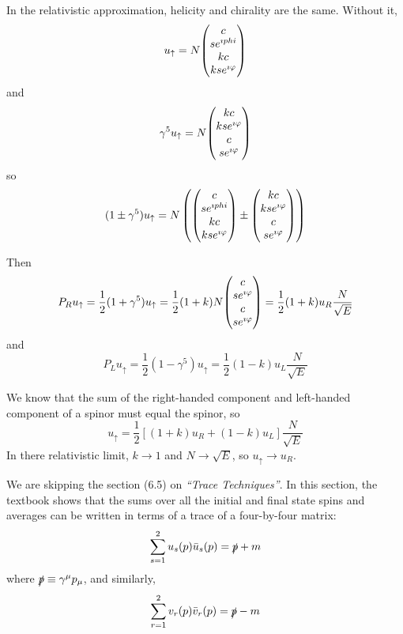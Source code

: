\documentclass[a4paper,twoside,master.tex]{subfiles}
\begin{document}

In the relativistic approximation, helicity and chirality are the same. Without it,
\begin{equation}
    u_{\uparrow} = N \mqty(c\\s e^{\imath ph i} \\kc\\kse^{\imath \varphi})
\end{equation}
and
\begin{equation}
    \gamma^5 u_{\uparrow} = N \mqty(kc\\kse^{\imath \varphi} \\c\\se^{\imath \varphi})
\end{equation}
so
\begin{equation}
    (1\pm \gamma^5)u_{\uparrow} = N\left( \mqty(c\\s e^{\imath ph i} \\kc\\kse^{\imath \varphi}) \pm \mqty(kc\\kse^{\imath \varphi} \\c\\se^{\imath \varphi}) \right)
\end{equation}

Then
\begin{equation}
    P_R u_{\uparrow} = \frac{1}{2} (1 + \gamma^5) u_{\uparrow} = \frac{1}{2} (1 + k)N \mqty(c\\s e^{\imath \varphi} \\c\\s e^{\imath \varphi}) = \frac{1}{2} (1 + k)u_R \frac{N}{\sqrt{E}}
\end{equation}
and
\begin{equation}
    P_L u_{\uparrow} = \frac{1}{2} (1 - \gamma^5)u_{\uparrow} = \frac{1}{2} (1 - k)u_L \frac{N}{\sqrt{E}}
\end{equation}

We know that the sum of the right-handed component and left-handed component of a spinor must equal the spinor, so
\begin{equation}
    u_{\uparrow} = \frac{1}{2} \left[ (1 + k)u_R + (1-k)u_L \right] \frac{N}{\sqrt{E}}
\end{equation}
In there relativistic limit, $ k \to 1 $ and $ N \to \sqrt{E} $, so $ u_{\uparrow} \to u_R $.

We are skipping the section (6.5) on \textit{``Trace Techniques''}. In this section, the textbook shows that the sums over all the initial and final state spins and averages can be written in terms of a trace of a four-by-four matrix:
\begin{equation}
    \sum_{s=1}^{2} u_s(p) \bar{u}_s(p) = \slashed{p} + m
\end{equation}
where $ \slashed{p} \equiv \gamma^{\mu} p_{\mu} $, and similarly,
\begin{equation}
    \sum_{r=1}^{2} v_r(p) \bar{v}_r(p) = \slashed{p} - m
\end{equation}
\end{document}
